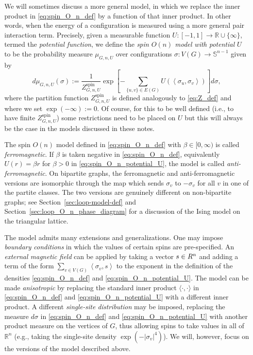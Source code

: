 \documentclass[12pt,reqno]{article}
\def\R{\mathbb{R}}
\begin{document}
We will sometimes discuss a more general model, in which we replace
the inner product in \eqref{eq:spin_O_n_def} by a function of that
inner product. In other words, when the energy of a configuration is
measured using a more general pair interaction term. Precisely,
given a measurable function $U:[-1,1]\to\R\cup\{\infty\}$, termed the
\emph{potential function}, we define the \emph{spin $O(n)$ model
with potential $U$} to be the probability measure $\mu_{G,n,U}$ over
configurations $\sigma:V(G)\to \mathbb S^{n-1}$ given by
\begin{equation}\label{eq:spin_O_n_potential_U}
  d\mu_{G,n,U}(\sigma) := \frac{1}{Z^{\text{spin}}_{G,n,U}} \exp \left[-\sum_{\{u,v\}\in
E(G)}U(\left\langle\sigma_u,\sigma_v\right\rangle)\right]
  d\sigma,
\end{equation}
where the partition function $Z^{\text{spin}}_{G,n,U}$ is defined analogously to \eqref{eq:Z_def} and where we set $\exp(-\infty):=0$. Of course, for this to be well defined (i.e., to have finite $Z^{\text{spin}}_{G,n,U}$) some restrictions need to be placed on $U$ but this will always be the case in the models discussed in these notes.

The spin $O(n)$ model defined in \eqref{eq:spin_O_n_def} with $\beta\in[0,\infty)$ is called \emph{ferromagnetic}. If $\beta$ is taken negative in \eqref{eq:spin_O_n_def}, equivalently $U(r) = \beta r$ for $\beta>0$ in \eqref{eq:spin_O_n_potential_U}, the model is called \emph{anti-ferromagnetic}. On bipartite graphs, the ferromagnetic and anti-ferromagnetic versions are isomorphic through the map which sends $\sigma_v$ to $-\sigma_v$ for all $v$ in one of the partite classes. The two versions are genuinely different on non-bipartite graphs; see Section~\ref{sec:loop-model-def} and Section~\ref{sec:loop_O_n_phase_diagram} for a discussion of the Ising model on the triangular lattice.


The model admits many extensions and generalizations. One may impose \emph{boundary conditions} in which
the values of certain spins are pre-specified. An \emph{external magnetic
field} can be applied by taking a vector $s\in\mathbb \R^n$ and adding a term
of the form $\sum_{v\in V(G)} \left\langle \sigma_v,s\right\rangle$ to the exponent in the definition of the densities
\eqref{eq:spin_O_n_def} and \eqref{eq:spin_O_n_potential_U}. The model can be made \emph{anisotropic} by replacing the standard inner product $\langle\cdot,\cdot\rangle$ in \eqref{eq:spin_O_n_def} and \eqref{eq:spin_O_n_potential_U} with a different inner product. A different \emph{single-site distribution} may be imposed, replacing the measure $d\sigma$ in \eqref{eq:spin_O_n_def} and \eqref{eq:spin_O_n_potential_U} with another product measure on the vertices of $G$, thus allowing spins to take values in all of $\R^{n}$ (e.g., taking the single-site density $\exp(-|\sigma_v|^4)$). We will, however, focus on the versions of
the model described above.
\end{document}
